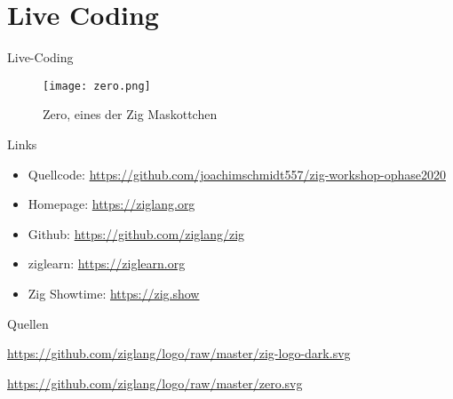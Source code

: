 \documentclass{beamer}
\begin{document}
\section{Live Coding}

\begin{frame}{Live-Coding}
    \begin{figure}
        \centering
        \texttt{[image: zero.png]}
        \caption{Zero, eines der Zig Maskottchen \cite{zero}}
        \label{fig:zero}
    \end{figure}
\end{frame}

\begin{frame}{Links}
    \begin{itemize}
        \item Quellcode: \url{https://github.com/joachimschmidt557/zig-workshop-ophase2020}
        \item Homepage: \url{https://ziglang.org}
        \item Github: \url{https://github.com/ziglang/zig}
        \item ziglearn: \url{https://ziglearn.org}
        \item Zig Showtime: \url{https://zig.show}
    \end{itemize}
\end{frame}

\begin{frame}{Quellen}
\begin{thebibliography}{}
\url{https://github.com/ziglang/logo/raw/master/zig-logo-dark.svg}

\url{https://github.com/ziglang/logo/raw/master/zero.svg}

\end{thebibliography}
\end{frame}
\end{document}
